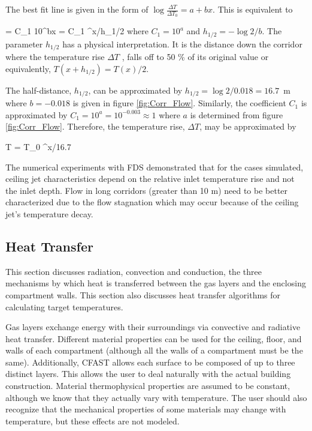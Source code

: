 The best fit line is given in the form of $\log{\frac{\Delta T}{\Delta T_0}} = a + bx$. This is equivalent to

\be {} = C_1 10^{bx}  = C_1 ^{x/h_{1/2}} \ee
where $C_1 = 10^a$ and $h_{1/2} = - \log{2}/b$. The parameter $h_{1/2}$ has a physical interpretation.  It is the distance down the corridor where the temperature rise $\Delta T$ , falls off to 50 \% of its original value or equivalently, $T(x + h_{1/2}) = T (x)/2$.

The half-distance, $h_{1/2}$, can be approximated by $h_{1/2} = \log{2}/0.018 = 16.7$~m where $b = -0.018$ is given in figure \ref{fig:Corr_Flow}. Similarly, the coefficient $C_1$ is approximated by $C_1 = 10^a = 10^{-0.003} \approx 1$ where $a$ is determined from figure \ref{fig:Corr_Flow}. Therefore, the temperature rise, $\Delta T$, may be approximated by

\be \Delta T = \Delta T_0 ^{x/16.7} \ee

The numerical experiments with FDS  demonstrated that for the cases simulated, ceiling jet characteristics depend on the relative inlet temperature rise and not the inlet depth.  Flow in long corridors (greater than 10 m) need to be better characterized due to the flow stagnation which may occur because of the ceiling jet's temperature decay.

\subsection{Heat Transfer}

This section discusses radiation, convection and conduction, the three mechanisms by which heat is transferred between the gas layers and the enclosing compartment walls.  This section also discusses heat transfer algorithms for calculating target temperatures.

Gas layers exchange energy with their surroundings via convective and radiative heat transfer.  Different material properties can be used for the ceiling, floor, and walls of each compartment (although all the walls of a compartment must be the same).  Additionally, CFAST allows each surface to be composed of up to three distinct layers.  This allows the user to deal naturally with the actual building construction.  Material thermophysical properties are assumed to be constant, although we know that they actually vary with temperature. The user should also recognize that the mechanical properties of some materials may change with temperature, but these effects are not modeled.						

